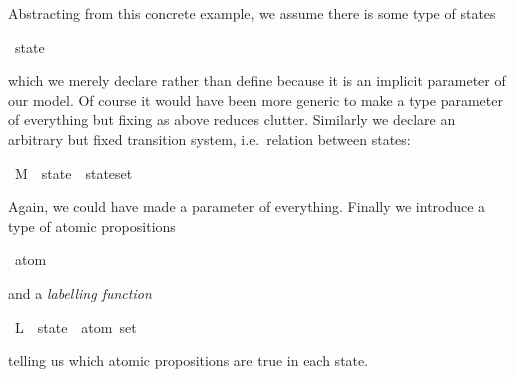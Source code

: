 \begin{isabellebody}
\begin{isamarkuptext}
Abstracting from this concrete example, we assume there is some type of
states%
\end{isamarkuptext}%
\ state%
\begin{isamarkuptext}%
\noindent
which we merely declare rather than define because it is an implicit
parameter of our model.  Of course it would have been more generic to make
 a type parameter of everything but fixing  as above
reduces clutter.
Similarly we declare an arbitrary but fixed transition system, i.e.\
relation between states:%
\end{isamarkuptext}%
\ M\ {\isacharcolon}{\isacharcolon}\ {\isachardoublequote}{\isacharparenleft}state\ {\isasymtimes}\ state{\isacharparenright}set{\isachardoublequote}%
\begin{isamarkuptext}%
\noindent
Again, we could have made  a parameter of everything.
Finally we introduce a type of atomic propositions%
\end{isamarkuptext}%
\ atom%
\begin{isamarkuptext}%
\noindent
and a \emph{labelling function}%
\end{isamarkuptext}%
\ L\ {\isacharcolon}{\isacharcolon}\ {\isachardoublequote}state\ {\isasymRightarrow}\ atom\ set{\isachardoublequote}%
\begin{isamarkuptext}%
\noindent
telling us which atomic propositions are true in each state.%
\end{isamarkuptext}%
\end{isabellebody}%
